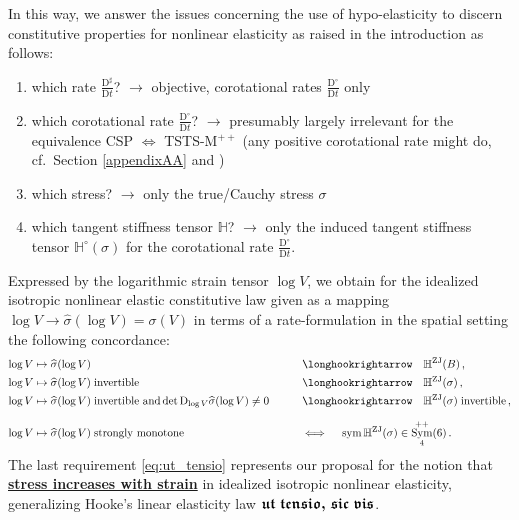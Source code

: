 \documentclass[10pt]{article}
\numberwithin{theoremCounter}{section}
\theoremstyle{plain}
\theoremstyle{definition}
\newcommand{\DD}{\mathrm{D}}
\DeclareMathOperator{\Sym}{Sym}
\DeclareMathOperator{\sym}{sym}
\DeclareMathOperator{\ZJ}{ZJ}
\def\H{\mathbb{H}}
\numberwithin{equation}{section}
\begin{document}
In this way, we answer the issues concerning the use of hypo-elasticity to discern constitutive properties for nonlinear elasticity as raised in the introduction as follows:
	\begin{enumerate}
	\item[1a)] which rate $\frac{\DD^{\sharp}}{\DD t}$? $\rightarrow$ objective, corotational rates $\frac{\DD^{\circ}}{\DD t}$ only
	\item[1b)] which corotational rate $\frac{\DD^{\circ}}{\DD t}$? $\rightarrow$ presumably largely irrelevant for the equivalence CSP $\iff$ TSTS-M$^{++}$ \break \hspace*{133pt} (any positive corotational rate might do, cf.~Section \ref{appendixAA} and \cite{neffkoro2024})
	\item[2)] which stress? $\rightarrow$ only the true/Cauchy stress $\sigma$
	\item[3)] which tangent stiffness tensor $\H$? $\rightarrow$ only the induced tangent stiffness tensor $\H^{\circ}(\sigma)$ \newline \hspace*{5.6cm} for the corotational rate $\frac{\DD^{\circ}}{\DD t}$.
	\end{enumerate}
Expressed by the logarithmic strain tensor $\log V$, we obtain for the idealized isotropic nonlinear elastic constitutive law given as a mapping $\log V \to \widehat \sigma(\log V) = \sigma(V)$ in terms of a rate-formulation in the spatial setting the following concordance:
	\begin{alignat}{3}
	\log V &\mapsto \widehat \sigma(\log V) \qquad && \longhookrightarrow \quad \H^{\ZJ}(B)\,, \nonumber\\
	\log V &\mapsto \widehat \sigma(\log V) \; \textnormal{invertible} \qquad && \longhookrightarrow \quad \H^{\ZJ}(\sigma)\,, \nonumber\\
	\log V &\mapsto \widehat \sigma(\log V) \; \textnormal{invertible and} \det \DD_{\log V} \widehat \sigma(\log V) \neq 0 \qquad &&\longhookrightarrow \quad \H^{\ZJ}(\sigma) \; \textnormal{invertible}\,, \nonumber\\[.7em]
	\log V &\mapsto \widehat \sigma(\log V) \; \textnormal{strongly monotone} \qquad &&\!\! \iff \quad \sym \H^{\ZJ}(\sigma) \in \Sym^{++}_4(6)\,. \label{eq:ut_tensio}
	\end{alignat}
The last requirement \eqref{eq:ut_tensio} represents our proposal for the notion that \underline{\textbf{{stress increases with strain}}} in idealized isotropic nonlinear elasticity, generalizing Hooke's linear elasticity law \underline{$\boldsymbol{\mathfrak{ut \; tensio\smash{,}\,\, sic \; vis}}$}.
\end{document}

